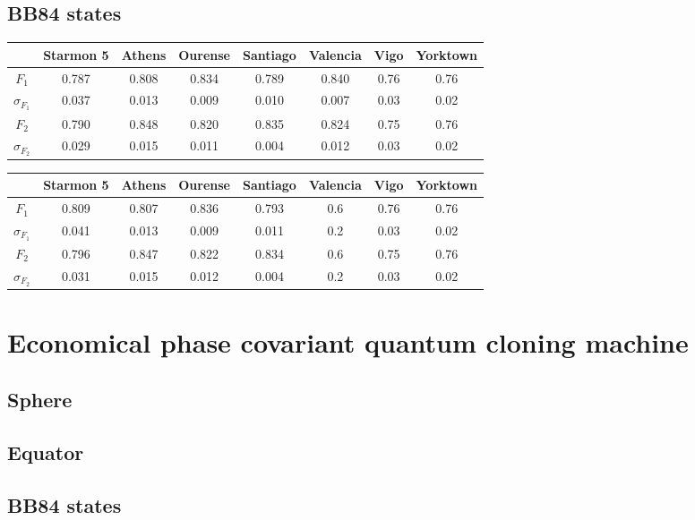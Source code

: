 \subsection{BB84 states}


\begin{table}[H]
    \centering
    \begin{tabular}{|c|c|c|c|c|c|c|c|}
    \hline
    \textbf{} & \textbf{Starmon 5} & \textbf{Athens} & \textbf{Ourense} & \textbf{Santiago} & \textbf{Valencia} & \textbf{Vigo} & \textbf{Yorktown} \\ \hline
    $F_1$              & 0.787 & 0.808 & 0.834 & 0.789 & 0.840 & 0.76 & 0.76 \\ \hline
    $\sigma_{F_1}$     & 0.037 & 0.013 & 0.009 & 0.010 & 0.007 & 0.03 & 0.02 \\ \hline
    $F_2$              & 0.790 & 0.848 & 0.820 & 0.835 & 0.824 & 0.75 & 0.76 \\ \hline
    $\sigma_{F_2}$     & 0.029 & 0.015 & 0.011 & 0.004 & 0.012 & 0.03 & 0.02 \\ \hline
    \end{tabular}
\end{table}

\begin{table}[H]
    \centering
    \begin{tabular}{|c|c|c|c|c|c|c|c|}
    \hline
    \textbf{} & \textbf{Starmon 5} & \textbf{Athens} & \textbf{Ourense} & \textbf{Santiago} & \textbf{Valencia} & \textbf{Vigo} & \textbf{Yorktown} \\ \hline
    $F_1$              & 0.809 & 0.807 & 0.836 & 0.793 & 0.6 & 0.76 & 0.76 \\ \hline
    $\sigma_{F_1}$     & 0.041 & 0.013 & 0.009 & 0.011 & 0.2 & 0.03 & 0.02 \\ \hline
    $F_2$              & 0.796 & 0.847 & 0.822 & 0.834 & 0.6 & 0.75 & 0.76 \\ \hline
    $\sigma_{F_2}$     & 0.031 & 0.015 & 0.012 & 0.004 & 0.2 & 0.03 & 0.02 \\ \hline
    \end{tabular}
\end{table}
\section{Economical phase covariant quantum cloning machine}
\subsection{Sphere}
\subsection{Equator}
\subsection{BB84 states}